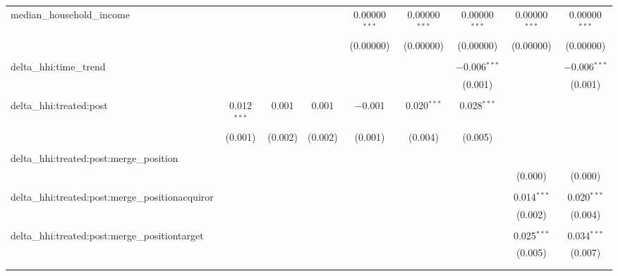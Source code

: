 \begin{table}[H]
{\begin{tabular}{@{\extracolsep{5pt}}lcccccccc}
  median\_household\_income &  &  &  & 0.00000$^{***}$ & 0.00000$^{***}$ & 0.00000$^{***}$ & 0.00000$^{***}$ & 0.00000$^{***}$ \\  

   &  &  &  & (0.00000) & (0.00000) & (0.00000) & (0.00000) & (0.00000) \\  

   & & & & & & & & \\  

  delta\_hhi:time\_trend &  &  &  &  &  & $-$0.006$^{***}$ &  & $-$0.006$^{***}$ \\  

   &  &  &  &  &  & (0.001) &  & (0.001) \\  

   & & & & & & & & \\  

  delta\_hhi:treated:post & 0.012$^{***}$ & 0.001 & 0.001 & $-$0.001 & 0.020$^{***}$ & 0.028$^{***}$ &  &  \\  

   & (0.001) & (0.002) & (0.002) & (0.001) & (0.004) & (0.005) &  &  \\  

   & & & & & & & & \\  

  delta\_hhi:treated:post:merge\_position &  &  &  &  &  &  &  &  \\  

   &  &  &  &  &  &  & (0.000) & (0.000) \\  

   & & & & & & & & \\  

  delta\_hhi:treated:post:merge\_positionacquiror &  &  &  &  &  &  & 0.014$^{***}$ & 0.020$^{***}$ \\  

   &  &  &  &  &  &  & (0.002) & (0.004) \\  

   & & & & & & & & \\  

  delta\_hhi:treated:post:merge\_positiontarget &  &  &  &  &  &  & 0.025$^{***}$ & 0.034$^{***}$ \\  

   &  &  &  &  &  &  & (0.005) & (0.007) \\  

   & & & & & & & & \\  

 \hline \\[-1.8ex]  


\end{tabular}}
\end{table}
